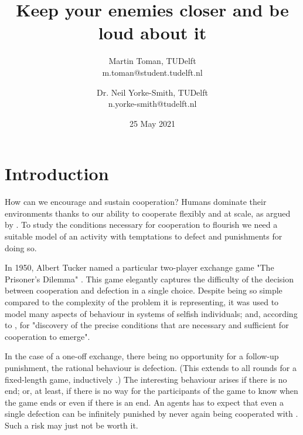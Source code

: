 \documentclass[english]{article}
\begin{document}
\listoftodos

\title{Keep your enemies closer and be loud about it}
\author{
  Martin Toman, TUDelft
  \\
  m.toman@student.tudelft.nl
\and
  Dr. Neil Yorke-Smith, TUDelft
  \\
  n.yorke-smith@tudelft.nl
}
\date{25 May 2021}
\maketitle


\begin{abstract}

\end{abstract}



\section{Introduction}

How can we encourage and sustain cooperation? Humans dominate their environments thanks to our ability to cooperate flexibly and at scale, as argued by \citet{harari-sapiens}.
To study the conditions necessary for cooperation to flourish we need a suitable model of an activity with temptations to defect and punishments for doing so.

In 1950, Albert Tucker named a particular two-player exchange game "The Prisoner's Dilemma" \citep{sep-prisoner-dilemma}.
This game elegantly captures the difficulty of the decision between cooperation and defection in a single choice.
Despite being so simple compared to the complexity of the problem it is representing, it was used to model many aspects of behaviour in systems of selfish individuals; and, according to \citet{Axelrod84}, for "discovery of the precise conditions that are necessary and sufficient for cooperation to emerge".

In the case of a one-off exchange, there being no opportunity for a follow-up punishment, the rational behaviour is defection. (This extends to all rounds for a fixed-length game, inductively \citep{Axelrod84}.)
The interesting behaviour arises if there is no end; or, at least, if there is no way for the participants of the game to know when the game ends or even if there is an end.
An agents has to expect that even a single defection can be infinitely punished by never again being cooperated with \citep{GRIM}.
Such a risk may just not be worth it.
\end{document}
